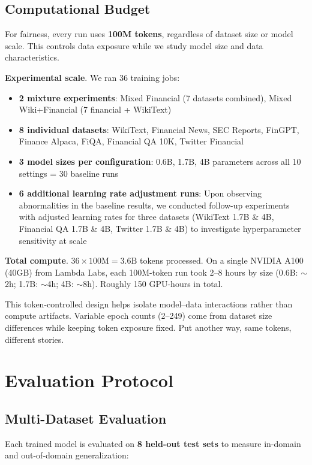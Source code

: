 \subsection{Computational Budget}

For fairness, every run uses \textbf{100M tokens}, regardless of dataset size or model scale. This controls data exposure while we study model size and data characteristics.

\textbf{Experimental scale}. We ran 36 training jobs:
\begin{itemize}
    \item \textbf{2 mixture experiments}: Mixed Financial (7 datasets combined), Mixed Wiki+Financial (7 financial + WikiText)
    \item \textbf{8 individual datasets}: WikiText, Financial News, SEC Reports, FinGPT, Finance Alpaca, FiQA, Financial QA 10K, Twitter Financial
    \item \textbf{3 model sizes per configuration}: 0.6B, 1.7B, 4B parameters across all 10 settings = 30 baseline runs
    \item \textbf{6 additional learning rate adjustment runs}: Upon observing abnormalities in the baseline results, we conducted follow-up experiments with adjusted learning rates for three datasets (WikiText 1.7B \& 4B, Financial QA 1.7B \& 4B, Twitter 1.7B \& 4B) to investigate hyperparameter sensitivity at scale
\end{itemize}

\textbf{Total compute}. $36 \times 100\text{M} = 3.6\text{B}$ tokens processed. On a single NVIDIA A100 (40GB) from Lambda Labs, each 100M-token run took 2--8 hours by size (0.6B: $\sim$2h; 1.7B: $\sim$4h; 4B: $\sim$8h). Roughly 150 GPU-hours in total.

This token-controlled design helps isolate model--data interactions rather than compute artifacts. Variable epoch counts (2--249) come from dataset size differences while keeping token exposure fixed. Put another way, same tokens, different stories.

\section{Evaluation Protocol}

\subsection{Multi-Dataset Evaluation}

Each trained model is evaluated on \textbf{8 held-out test sets} to measure in-domain and out-of-domain generalization:

